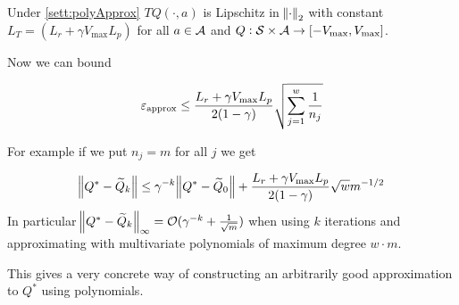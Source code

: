 \begin{lem}
  Under \cref{sett:polyApprox} 
  $TQ(\cdot, a)$ is Lipschitz in $\norm{\cdot}_2$ with constant
  $ L_T = (L_r + \gamma V_{\max} L_p) $
  for all $a \in \mathcal{A}$ and $Q : \mathcal{S} \times \mathcal{A} \to [-V_{\max},V_{\max}]$.
\end{lem}

Now we can bound

\begin{prop}
  \[ \varepsilon_{\mathrm{approx}} \leq \frac{L_r + \gamma V_{\max} L_p}{2(1-\gamma)}
  \sqrt{\sum_{j=1}^w \frac{1}{n_j}} \]
\end{prop}

For example if we put $n_j = m$ for all $j$ we get

\begin{prop}
  \[ \norm{Q^* - \widetilde{Q}_k} \leq \gamma^{-k} \norm{Q^* - \widetilde{Q}_0}
    + \frac{L_r + \gamma V_{\max} L_p}{2(1-\gamma)} \sqrt{w}
  m^{-1/2} \]
  In particular $\norm{Q^* - \widetilde{Q}_k}_\infty
  = \mathcal{O}(\gamma^{-k} + \frac{1}{\sqrt{m}})$
  when using $k$ iterations and approximating
  with multivariate polynomials of maximum degree $w \cdot m$.
\end{prop}

This gives a very concrete way of constructing an arbitrarily good
approximation to $Q^*$ using polynomials.



